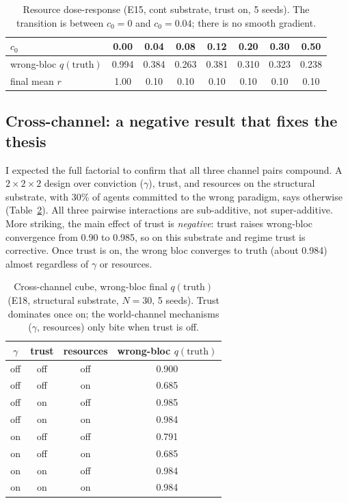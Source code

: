 \documentclass[11pt]{article}
\newcommand{\qtrue}{q(\text{truth})}
\begin{document}
\begin{table}[t]
\centering
\caption{Resource dose-response (E15, cont substrate, trust on, 5 seeds). The
transition is between $c_0=0$ and $c_0=0.04$; there is no smooth gradient.}
\label{tab:e15}
\begin{tabular}{lccccccc}
\toprule
$c_0$ & 0.00 & 0.04 & 0.08 & 0.12 & 0.20 & 0.30 & 0.50 \\
\midrule
wrong-bloc $\qtrue$ & 0.994 & 0.384 & 0.263 & 0.381 & 0.310 & 0.323 & 0.238 \\
final mean $r$ & 1.00 & 0.10 & 0.10 & 0.10 & 0.10 & 0.10 & 0.10 \\
\bottomrule
\end{tabular}
\end{table}

\subsection{Cross-channel: a negative result that fixes the thesis}
\label{sec:crosschannel}

I expected the full factorial to confirm that all three channel pairs compound.
A $2\times2\times2$ design over conviction ($\gamma$), trust, and resources on
the structural substrate, with 30\% of agents committed to the wrong paradigm,
says otherwise (Table~\ref{tab:e18}). All three pairwise interactions are
sub-additive, not super-additive. More striking, the main effect of trust is
\emph{negative}: trust raises wrong-bloc convergence from 0.90 to 0.985, so on
this substrate and regime trust is corrective. Once trust is on, the wrong bloc
converges to truth (about 0.984) almost regardless of $\gamma$ or resources.

\begin{table}[t]
\centering
\caption{Cross-channel cube, wrong-bloc final $\qtrue$ (E18, structural
substrate, $N=30$, 5 seeds). Trust dominates once on; the world-channel
mechanisms ($\gamma$, resources) only bite when trust is off.}
\label{tab:e18}
\begin{tabular}{cccc}
\toprule
$\gamma$ & trust & resources & wrong-bloc $\qtrue$ \\
\midrule
off & off & off & 0.900 \\
off & off & on  & 0.685 \\
off & on  & off & 0.985 \\
off & on  & on  & 0.984 \\
on  & off & off & 0.791 \\
on  & off & on  & 0.685 \\
on  & on  & off & 0.984 \\
on  & on  & on  & 0.984 \\
\bottomrule
\end{tabular}
\end{table}
\end{document}
